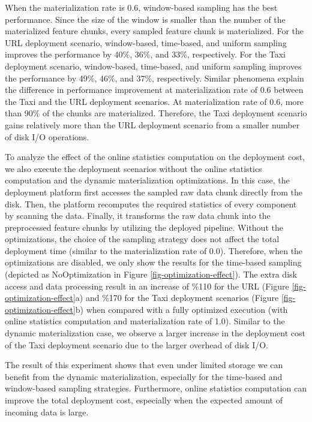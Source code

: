 When the materialization rate is 0.6, window-based sampling has the best performance.
Since the size of the window is smaller than the number of the materialized feature chunks, every sampled feature chunk is materialized.
For the URL deployment scenario, window-based, time-based, and uniform sampling improves the performance by 40\%, 36\%, and 33\%, respectively.
For the Taxi deployment scenario, window-based, time-based, and uniform sampling improves the performance by 49\%, 46\%, and 37\%, respectively.
Similar phenomena explain the difference in performance improvement at materialization rate of 0.6 between the Taxi and the URL deployment scenarios.
At materialization rate of 0.6, more than 90\% of the chunks are materialized.
Therefore, the Taxi deployment scenario gains relatively more than the URL deployment scenario from a smaller number of disk I/O operations.

To analyze the effect of the online statistics computation on the deployment cost, we also execute the deployment scenarios without the online statistics computation and the dynamic materialization optimizations.
In this case, the deployment platform first accesses the sampled raw data chunk directly from the disk.
Then, the platform recomputes the required statistics of every component by scanning the data.
Finally, it transforms the raw data chunk into the preprocessed feature chunks by utilizing the deployed pipeline.
Without the optimizations, the choice of the sampling strategy does not affect the total deployment time (similar to the materialization rate of 0.0).
Therefore, when the optimizations are disabled, we only show the results for the time-based sampling (depicted as NoOptimization in Figure \ref{fig-optimization-effect}).
The extra disk access and data processing result in an increase of \%110 for the URL (Figure \ref{fig-optimization-effect}a) and \%170 for the Taxi deployment scenarios (Figure \ref{fig-optimization-effect}b) when compared with a fully optimized execution (with online statistics computation and materialization rate of 1.0).
Similar to the dynamic materialization case, we observe a larger increase in the deployment cost of the Taxi deployment scenario due to the larger overhead of disk I/O.

The result of this experiment shows that even under limited storage we can benefit from the dynamic materialization, especially for the time-based and window-based sampling strategies.
Furthermore, online statistics computation can improve the total deployment cost, especially when the expected amount of incoming data is large.

